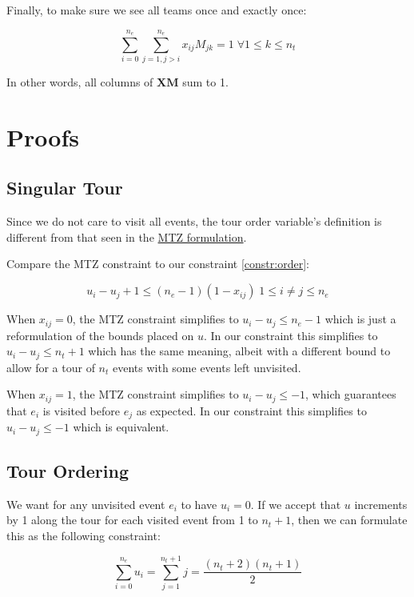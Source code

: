 \documentclass[11pt]{article}
\begin{document}
Finally, to make sure we see all teams once and exactly once:

\begin{equation} \label{constr:teams}
    \sum_{i=0}^{n_e} \sum_{j=1, j > i}^{n_e} x_{ij}M_{jk}  = 1 \; \forall 1 \leq k \leq n_t
\end{equation}

In other words, all columns of $\mathbf{X} \mathbf{M}$ sum to 1.

\section{Proofs}
\subsection{Singular Tour}
Since we do not care to visit all events, the tour order variable's definition is different from that seen in the \href{https://en.wikipedia.org/wiki/Travelling_salesman_problem#Miller%E2%80%93Tucker%E2%80%93Zemlin_formulation}{MTZ formulation}.

Compare the MTZ constraint to our constraint \eqref{constr:order}:

\begin{equation} \label{constr:mtz}
    u_i - u_j + 1 \leq (n_e - 1)(1 - x_{ij}) \; 1 \leq i \neq j \leq n_e
\end{equation}

When $x_{ij} = 0$, the MTZ constraint simplifies to $u_i - u_j \leq n_e - 1$ which is just a reformulation of the bounds placed on $u$. In our constraint this simplifies to $u_i - u_j \leq n_t + 1$ which has the same meaning, albeit with a different bound to allow for a tour of $n_t$ events with some events left unvisited.

When $x_{ij} = 1$, the MTZ constraint simplifies to $u_i - u_j \leq -1$, which guarantees that $e_i$ is visited before $e_j$ as expected. In our constraint this simplifies to $u_i - u_j \leq -1$ which is equivalent.

\subsection{Tour Ordering}
We want for any unvisited event $e_i$ to have $u_i = 0$. If we accept that $u$ increments by 1 along the tour for each visited event from 1 to $n_t + 1$, then we can formulate this as the following constraint:

\begin{equation} \label{constr:unvisited}
    \sum_{i=0}^{n_e} u_i = \sum_{j=1}^{n_t + 1} j = \frac{(n_t + 2)(n_t + 1)}{2}
\end{equation}
\end{document}
